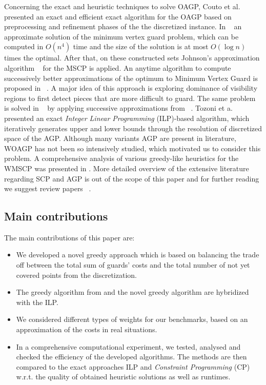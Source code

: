 \documentclass[runningheads,a4paper]{elsarticle}
\begin{document}
	Concerning the exact and heuristic techniques to solve OAGP, Couto et al.~\cite{couto2007exact} presented an exact and efficient exact algorithm for the OAGP based on preprocessing and refinement phases of the the discretized instance. In ~\cite{ghosh2010approximation} an approximate solution of the minimum vertex guard problem, which can be computed in $O(n^4)$ time and the size of the solution is at most $O(\log n)$ times the optimal. After that, on these constructed sets Johnson’s approximation algorithm ~\cite{johnson1974approximation} for the MSCP is applied. An anytime algorithm to compute successively better approximations of the optimum to Minimum Vertex Guard is proposed in ~\cite{tomas2003approximation}.  A major idea of this approach is exploring dominance of visibility regions to first detect pieces that are
	more difficult to guard. The same problem is solved   in ~\cite{tomas2006visibility} by applying successive approximations from  ~\cite{tomas2003approximation}.
	Tozoni et a. ~\cite{tozoni2013practical,tozoni2016algorithm}  presented an exact \emph{Integer Linear Programming}  (ILP)-based  algorithm, which iteratively generates upper and lower bounds through the resolution of discretized space of the AGP. Although many variants AGP are present in literature, WOAGP has not been so intensively studied, which motivated us to consider this problem.
	A comprehensive analysis of various greedy-like heuristics for the WMSCP was presented in \cite{vasko2016best}.
	More detailed overview of the extensive literature regarding SCP and AGP is out of the scope of this paper and for further reading we suggest review papers ~\cite{caprara2000algorithms,ren2010new,ghosh2010approximation2}.

	
	\subsection{Main contributions}
	The main contributions of this paper are:
	\begin{itemize}
		\item We developed a novel greedy approach which is based on balancing the trade off between the total sum of guards' costs and the total number of not yet covered points from the discretization.
	
		\item The  greedy algorithm from \cite{chvatal1979greedy} and the novel greedy algorithm are hybridized with the ILP.
		\item We considered different types of weights for our benchmarks, based on an approximation of the costs in real situations.
		\item In a comprehensive computational experiment,  we tested, analysed and checked the efficiency of the developed algorithms. The methods are then compared to the exact approaches ILP and \emph{Constraint Programming} (CP) w.r.t. the quality of obtained heuristic solutions as well as runtimes.
	\end{itemize}
\end{document}
